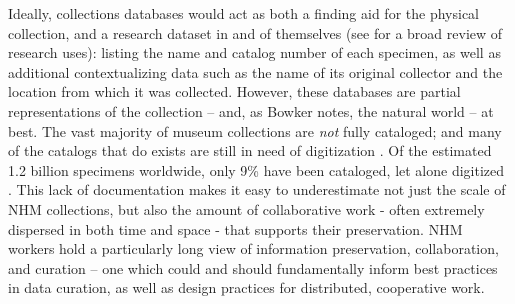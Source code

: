 Ideally, collections databases would act as both a finding aid for the physical collection, and a research dataset in and of themselves (see \cite{Chapman2005} for a broad review of research uses): listing the name and catalog number of each specimen, as well as additional contextualizing data such as the name of its original collector and the location from which it was collected. However, these databases are partial representations of the collection -- and, as Bowker notes, the natural world \cite{Bowker_2000} -- at best. The vast majority of museum collections are \textit{not} fully cataloged; and many of the catalogs that do exists are still in need of digitization \cite{Beaman_2012}. Of the estimated 1.2 billion specimens worldwide, only 9\% have been cataloged, let alone digitized \cite{Ari_o_2010}. This lack of documentation makes it easy to underestimate not just the scale of NHM collections, but also the amount of collaborative work  - often extremely dispersed in both time and space - that supports their preservation. NHM workers hold a particularly long view of information preservation, collaboration, and curation -- one which could and should fundamentally inform best practices in data curation, as well as design practices for distributed, cooperative work.